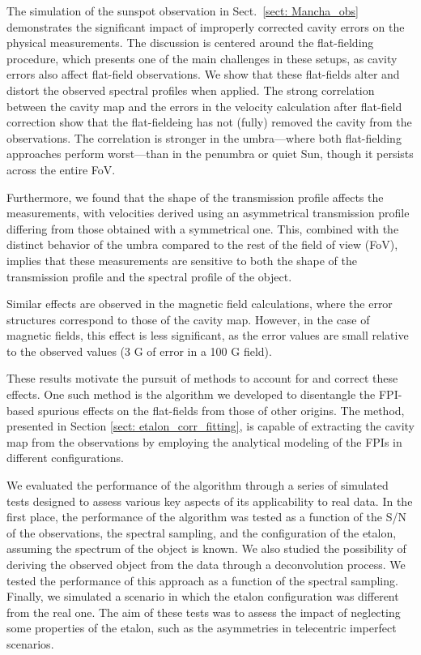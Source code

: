 The simulation of the sunspot observation in Sect.~\ref{sect: Mancha_obs} demonstrates the significant impact of improperly corrected cavity errors on the physical measurements. The discussion is centered around the flat-fielding procedure, which presents one of the main challenges in these setups, as cavity errors also affect flat-field observations. We show that these flat-fields alter and distort the observed spectral profiles when applied. The strong correlation between the cavity map and the errors in the velocity calculation after flat-field correction show that the flat-fieldeing has not (fully) removed the cavity from the observations. The correlation is stronger in the umbra—where both flat-fielding approaches perform worst—than in the penumbra or quiet Sun, though it persists across the entire FoV.

Furthermore, we found that the shape of the transmission profile affects the measurements, with velocities derived using an asymmetrical transmission profile differing from those obtained with a symmetrical one. This, combined with the distinct behavior of the umbra compared to the rest of the field of view (FoV), implies that these measurements are sensitive to both the shape of the transmission profile and the spectral profile of the object.

Similar effects are observed in the magnetic field calculations, where the error structures correspond to those of the cavity map. However, in the case of magnetic fields, this effect is less significant, as the error values are small relative to the observed values (3 G of error in a 100 G field).

These results motivate the pursuit of methods to account for and correct these effects. One such method is the algorithm we developed to disentangle the FPI-based spurious effects on the flat-fields from those of other origins. The method, presented in Section \ref{sect: etalon_corr_fitting}, is capable of extracting the cavity map from the observations by employing the analytical modeling of the FPIs in different configurations.

We evaluated the performance of the algorithm through a series of simulated tests designed to assess various key aspects of its applicability to real data. In the first place, the performance of the algorithm was tested as a function of the S/N of the observations, the spectral sampling, and the configuration of the etalon, assuming the spectrum of the object is known. We also studied the possibility of deriving the observed object from the data through a deconvolution process. We tested the performance of this approach as a function of the spectral sampling. Finally, we simulated a scenario in which the etalon configuration was different from the real one. The aim of these tests was to assess the impact of neglecting some properties of the etalon, such as the asymmetries in telecentric imperfect scenarios.

